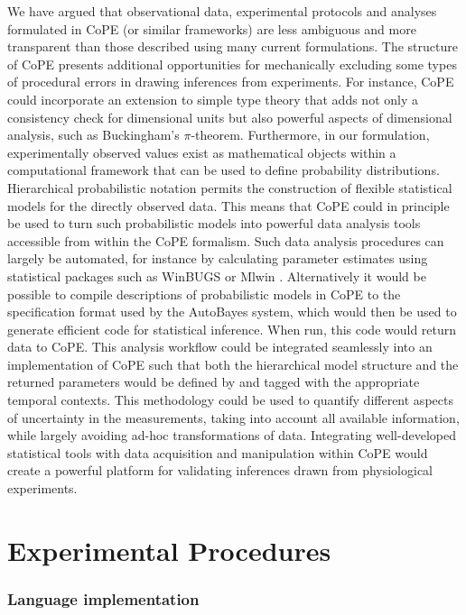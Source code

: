 We have argued that observational data, experimental protocols and
analyses formulated in CoPE (or similar frameworks) are less ambiguous
and more transparent than those described using many current
formulations. The structure of CoPE presents additional opportunities
for mechanically excluding some types of procedural errors in drawing
inferences from experiments. For instance, CoPE could incorporate an
extension to simple type theory \citep{Kennedy1997} that adds not only
a consistency check for dimensional units but also powerful aspects of
dimensional analysis, such as Buckingham's $\pi$-theorem. Furthermore,
in our formulation, experimentally observed values exist as
mathematical objects within a computational framework that can be used
to define probability distributions. Hierarchical probabilistic
notation \citep{Gelman2006} permits the construction of flexible
statistical models for the directly observed data. This means that
CoPE could in principle be used to turn such probabilistic models into
powerful data analysis tools accessible from within the CoPE
formalism.  Such data analysis procedures can largely be automated,
for instance by calculating parameter estimates using statistical
packages such as WinBUGS \citep{Gilks1994} or Mlwin
\citep{mlwin}. Alternatively it would be possible to compile
descriptions of probabilistic models in CoPE to the specification
format used by the AutoBayes \citep{AutoBayes} system, which would
then be used to generate efficient code for statistical
inference. When run, this code would return data to CoPE. This
analysis workflow could be integrated seamlessly into an
implementation of CoPE such that both the hierarchical model structure
and the returned parameters would be defined by and tagged with the
appropriate temporal contexts. This methodology could be used to
quantify different aspects of uncertainty in the measurements, taking
into account all available information, while largely avoiding ad-hoc
transformations of data. Integrating well-developed statistical tools
with data acquisition and manipulation within CoPE would create a
powerful platform for validating inferences drawn from physiological
experiments.

\section*{Experimental Procedures}

\subsubsection*{Language implementation}

